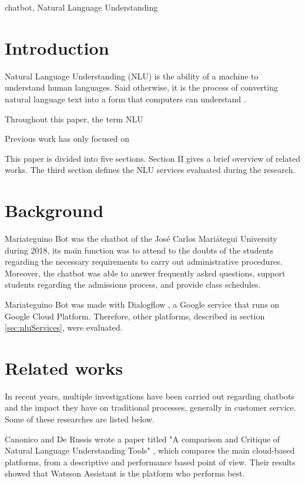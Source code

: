 \documentclass[conference]{IEEEtran}
\begin{document}
\begin{IEEEkeywords}
    chatbot, Natural Language Understanding
\end{IEEEkeywords}

\section{Introduction}
Natural Language Understanding (NLU) is the ability of a machine to understand human languages. Said otherwise, it is the process of converting natural language text into a form that computers can understand \cite{pathak2017artificial}.

Throughout this paper, the term NLU

Previous work has only focused on

This paper is divided into five sections. Section II gives a brief overview of related works. The third section defines the NLU services evaluated during the research.

\section{Background}
Mariateguino Bot was the chatbot of the José Carlos Mariátegui University during 2018, its main function was to attend to the doubts of the students regarding the necessary requirements to carry out administrative procedures. Moreover, the chatbot was able to answer frequently asked questions, support students regarding the admissions process, and provide class schedules.

Mariateguino Bot was made with Dialogflow \cite{dialogflow2020}, a Google service that runs on Google Cloud Platform. Therefore, other platforms, described in section \ref{sec:nluServices}, were evaluated.

\section{Related works}
In recent years, multiple investigations have been carried out regarding chatbots and the impact they have on traditional processes, generally in customer service. Some of these researches are listed below.

Canonico and De Russis wrote a paper titled "A comparison and Critique of Natural Language Understanding Tools" \cite{Canonico2018}, which compares the main cloud-based platforms, from a descriptive and performance based point of view. Their results showed that Watsson Assistant is the platform who performs best.
\end{document}
